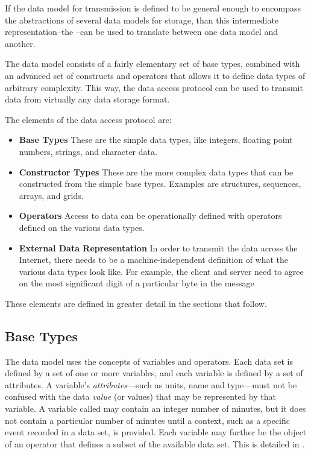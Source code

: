 If the data model for transmission is defined to be general enough to encompass
the abstractions of several data models for storage, than this intermediate
representation--the --can be used to translate between one data
model and another.

The \opendap data model consists of a fairly elementary set of base types, combined
with an advanced set of constructs and operators that allows it to
define data types of arbitrary complexity.  This way, the \opendap data access 
protocol can be used to transmit data from virtually any data storage format.

The elements of the \opendap data access protocol are:

\begin{itemize}

\item {\bf Base Types} These are the simple data types, like integers, floating
point numbers, strings, and character data.

\item {\bf Constructor Types} These are the more complex data types that can be constructed
from the simple base types.  Examples are structures, sequences, arrays, and grids.

\item {\bf Operators} Access to data can be operationally defined with operators defined
on the various data types.

\item {\bf External Data Representation} In order to transmit the data across the Internet,
there needs to be a machine-independent definition of what the various data types look
like.  For example, the client and server need to agree on the most significant digit
of a particular byte in the message

\end{itemize}

These elements are defined in greater detail in the sections that follow.

\subsection{Base Types}
\label{data,base-type}

The \opendap data model uses the concepts of variables and operators. Each
data set is defined by a set of one or more variables, and each
variable is defined by a set of attributes. A variable's
\emph{attributes}---such as units, name and type---must not be
confused with the data \emph{value} (or values) that may be
represented by that variable. A variable called  may contain
an integer number of minutes, but it does not contain a particular
number of minutes until a context, such as a specific event recorded
in a data set, is provided. Each variable may further be the object of
an operator that defines a subset of the available data set. This is
detailed in .

